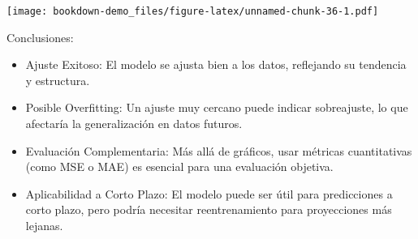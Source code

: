 \documentclass[
]{book}
\newenvironment{Shaded}{\begin{snugshade}}{\end{snugshade}}
\newcommand{\AttributeTok}[1]{\textcolor[rgb]{0.13,0.29,0.53}{#1}}
\newcommand{\CommentTok}[1]{\textcolor[rgb]{0.56,0.35,0.01}{\textit{#1}}}
\newcommand{\DecValTok}[1]{\textcolor[rgb]{0.00,0.00,0.81}{#1}}
\newcommand{\FunctionTok}[1]{\textcolor[rgb]{0.13,0.29,0.53}{\textbf{#1}}}
\newcommand{\NormalTok}[1]{#1}
\newcommand{\OtherTok}[1]{\textcolor[rgb]{0.56,0.35,0.01}{#1}}
\newcommand{\SpecialCharTok}[1]{\textcolor[rgb]{0.81,0.36,0.00}{\textbf{#1}}}
\newcommand{\StringTok}[1]{\textcolor[rgb]{0.31,0.60,0.02}{#1}}
\begin{document}
\begin{Shaded}
\end{Shaded}

\texttt{[image: bookdown-demo\_files/figure-latex/unnamed-chunk-36-1.pdf]}

Conclusiones:

\begin{itemize}
\item
  Ajuste Exitoso: El modelo se ajusta bien a los datos, reflejando su tendencia y estructura.
\item
  Posible Overfitting: Un ajuste muy cercano puede indicar sobreajuste, lo que afectaría la generalización en datos futuros.
\item
  Evaluación Complementaria: Más allá de gráficos, usar métricas cuantitativas (como MSE o MAE) es esencial para una evaluación objetiva.
\item
  Aplicabilidad a Corto Plazo: El modelo puede ser útil para predicciones a corto plazo, pero podría necesitar reentrenamiento para proyecciones más lejanas.
\end{itemize}
\end{document}
